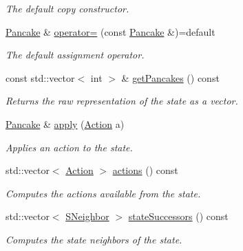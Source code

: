 \begin{DoxyCompactItemize}
\begin{DoxyCompactList}\small\item\em The default copy constructor. \end{DoxyCompactList}\item 
\hyperlink{structslb_1_1ext_1_1domain_1_1pancake_1_1Pancake}{Pancake} \& \hyperlink{structslb_1_1ext_1_1domain_1_1pancake_1_1Pancake_a799f0c9f3daa486aa128f7c116027010}{operator=} (const \hyperlink{structslb_1_1ext_1_1domain_1_1pancake_1_1Pancake}{Pancake} \&)=default
\begin{DoxyCompactList}\small\item\em The default assignment operator. \end{DoxyCompactList}\item 
const std\+::vector$<$ int $>$ \& \hyperlink{structslb_1_1ext_1_1domain_1_1pancake_1_1Pancake_a7a941aaeb61e28f180c0f532de09a0a1}{get\+Pancakes} () const 
\begin{DoxyCompactList}\small\item\em Returns the raw representation of the state as a vector. \end{DoxyCompactList}\item 
\hyperlink{structslb_1_1ext_1_1domain_1_1pancake_1_1Pancake}{Pancake} \& \hyperlink{structslb_1_1ext_1_1domain_1_1pancake_1_1Pancake_ac06a5cc4f552ec3e3393e5f3aadb0b0d}{apply} (\hyperlink{structslb_1_1ext_1_1domain_1_1pancake_1_1Pancake_aee972b60eec5485f6f53aabf5bcb4498}{Action} a)
\begin{DoxyCompactList}\small\item\em Applies an action to the state. \end{DoxyCompactList}\item 
std\+::vector$<$ \hyperlink{structslb_1_1ext_1_1domain_1_1pancake_1_1Pancake_aee972b60eec5485f6f53aabf5bcb4498}{Action} $>$ \hyperlink{structslb_1_1ext_1_1domain_1_1pancake_1_1Pancake_a646ad99ce5e1244737aa28df024068ec}{actions} () const 
\begin{DoxyCompactList}\small\item\em Computes the actions available from the state. \end{DoxyCompactList}\item 
std\+::vector$<$ \hyperlink{structslb_1_1ext_1_1domain_1_1pancake_1_1Pancake_aba7dccfec16eb9d48dff88303525ab30}{S\+Neighbor} $>$ \hyperlink{structslb_1_1ext_1_1domain_1_1pancake_1_1Pancake_a06bfa1b23f238c53cb0c3c73af28a7d1}{state\+Successors} () const 
\begin{DoxyCompactList}\small\item\em Computes the state neighbors of the state. \end{DoxyCompactList}\item 

\end{DoxyCompactItemize}

